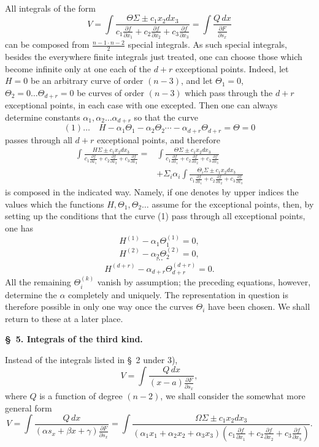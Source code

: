 \documentclass[10pt]{article}
\begin{document}
All integrals of the form
\[
V=\int\frac{\Theta\Sigma\pm c_1x_2dx_3}{c_1\frac{\partial f}{\partial x_1}+c_2\frac{\partial f}{\partial x_2}+c_3\frac{\partial f}{\partial x_3}}
=\int\frac{Q\,dx}{\frac{\partial F}{\partial s_x}}
\]
can be composed from $\frac{n-1\cdot n-2}{2}$ special integrals. As such special integrals, besides the everywhere finite integrals just treated, one can choose those which become infinite only at one each of the $d+r$ exceptional points. Indeed, let $H=0$ be an arbitrary curve of order $(n-3)$, and let $\Theta_1=0$, $\Theta_2=0\ldots\Theta_{d+r}=0$ be curves of order $(n-3)$ which pass through the $d+r$ exceptional points, in each case with one excepted. Then one can always determine constants $\alpha_1,\alpha_2\ldots\alpha_{d+r}$ so that the curve
\[
(1)\ldots\quad H-\alpha_1\Theta_1-\alpha_2\Theta_2\cdots-\alpha_{d+r}\Theta_{d+r}=\Theta=0
\]
passes through all $d+r$ exceptional points, and therefore
\[
\begin{aligned}
\int\frac{H\Sigma\pm c_1x_2dx_3}{c_1\frac{\partial f}{\partial x_1}+c_2\frac{\partial f}{\partial x_2}+c_3\frac{\partial f}{\partial x_3}}
={}&\int\frac{\Theta\Sigma\pm c_1x_2dx_3}{c_1\frac{\partial f}{\partial x_1}+c_2\frac{\partial f}{\partial x_2}+c_3\frac{\partial f}{\partial x_3}}\\
&+\Sigma_i\alpha_i\int\frac{\Theta_i\Sigma\pm c_1x_2dx_3}{c_1\frac{\partial f}{\partial x_1}+c_2\frac{\partial f}{\partial x_2}+c_3\frac{\partial f}{\partial x_3}}
\end{aligned}
\]
is composed in the indicated way. Namely, if one denotes by upper indices the values which the functions $H,\Theta_1,\Theta_2\ldots$ assume for the exceptional points, then, by setting up the conditions that the curve (1) pass through all exceptional points, one has
\[
H^{(1)}-\alpha_1\Theta_1^{(1)}=0,
\]
\[
H^{(2)}-\alpha_2\Theta_2^{(2)}=0,
\]
\[
\cdots
\]
\[
H^{(d+r)}-\alpha_{d+r}\Theta_{d+r}^{(d+r)}=0.
\]
All the remaining $\Theta_i^{(k)}$ vanish by assumption; the preceding equations, however, determine the $\alpha$ completely and uniquely. The representation in question is therefore possible in only one way once the curves $\Theta_i$ have been chosen. We shall return to these at a later place.

\begin{center}
{\bfseries \S\ 5. Integrals of the third kind.}
\end{center}

Instead of the integrals listed in \S\ 2 under 3),
\[
V=\int\frac{Q\,dx}{(x-a)\frac{\partial F}{\partial s_x}},
\]
where $Q$ is a function of degree $(n-2)$, we shall consider the somewhat more general form
\[
V=\int\frac{Q\,dx}{(\alpha s_x+\beta x+\gamma)\frac{\partial F}{\partial s_x}}
=\int\frac{\Omega\Sigma\pm c_1x_2dx_3}{(\alpha_1x_1+\alpha_2x_2+\alpha_3x_3)\left(c_1\frac{\partial f}{\partial x_1}+c_2\frac{\partial f}{\partial x_2}+c_3\frac{\partial f}{\partial x_3}\right)}.
\]
\end{document}
